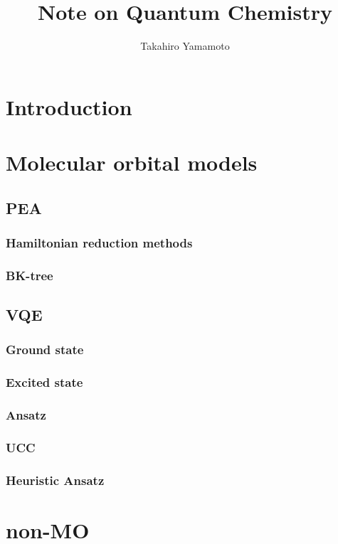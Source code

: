 \documentclass[11pt, oneside]{article}   	%
\title{Note on Quantum Chemistry}
\author{Takahiro Yamamoto}
\begin{document}
\maketitle
\section{Introduction}
\section{Molecular orbital models}
\subsection{PEA}
\subsubsection{Hamiltonian reduction methods}
\subsubsection{BK-tree}

\subsection{VQE}
\subsubsection{Ground state}
\subsubsection{Excited state}
\subsubsection{Ansatz}
\subsubsection{UCC}
\subsubsection{Heuristic Ansatz}

\section{non-MO}
\end{document}
